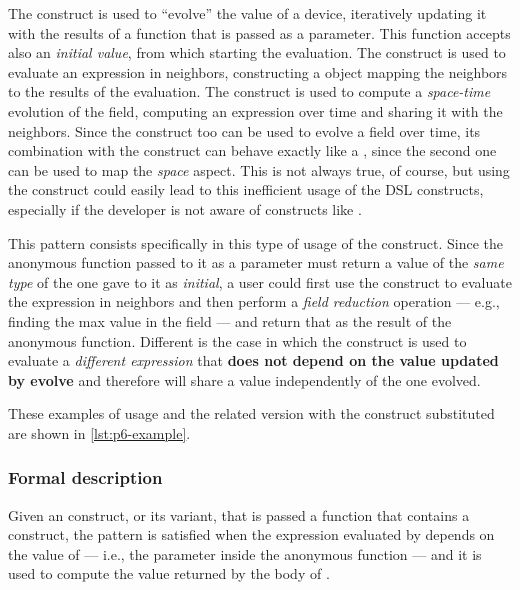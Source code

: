 \documentclass[12pt,a4paper,openright,twoside]{book}
\begin{document}
The  construct is used to ``evolve'' the value of a device,
iteratively updating it with the results of a function that is passed as a
parameter. This function accepts also an \emph{initial value}, from which
starting the evaluation. The  construct is used to evaluate an
expression in neighbors, constructing a  object mapping the
neighbors to the results of the evaluation. The  construct is used
to compute a \emph{space-time} evolution of the field, computing an expression
over time and sharing it with the neighbors. Since the  construct
too can be used to evolve a field over time, its combination with the
 construct can behave exactly like a , since the
second one can be used to map the \emph{space} aspect. 
%
This is not always true, of course, but using the  construct
could easily lead to this inefficient usage of the DSL constructs,  especially
if the developer is not aware of constructs like .

This pattern consists specifically in this type of usage of the 
construct. Since the anonymous function passed to it as a parameter must return
a value of the \emph{same type} of the one gave to it as \emph{initial}, a
user could first use the  construct to evaluate the expression
in neighbors and then perform a \emph{field reduction} operation --- e.g.,
finding the max value in the field --- and return that as the result of the
anonymous function.
%
Different is the case in which the  construct is used to
evaluate a \emph{different expression} that \textbf{does not depend on the value
updated by evolve} and therefore will share a value independently of the one
evolved.

These examples of usage and the related version with the  construct
substituted are shown in \cref{lst:p6-example}.



\subsubsection{Formal description}

Given an  construct, or its variant, that is passed a function that
contains a  construct, the pattern is satisfied when the
expression evaluated by  depends on the value of 
--- i.e., the parameter inside the anonymous function --- and it is used to
compute the value returned by the body of .
\end{document}
